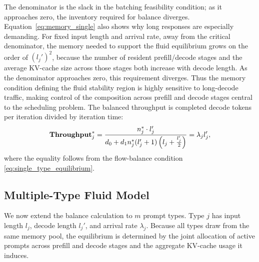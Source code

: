 The denominator is the slack in the batching feasibility condition; as it approaches zero, the inventory required for balance diverges. Equation~\eqref{eq:memory_single} also shows why long responses are especially demanding. For fixed input length and arrival rate, away from the critical denominator, the memory needed to support the fluid equilibrium grows on the order of \((l_j')^2\), because the number of resident prefill/decode stages and the average KV-cache size across those stages both increase with decode length. As the denominator approaches zero, this requirement diverges. Thus the memory condition defining the fluid stability region is highly sensitive to long-decode traffic, making control of the composition across prefill and decode stages central to the scheduling problem.
The balanced throughput is completed decode tokens per iteration divided by iteration time:
\begin{equation}\label{eq:throughput_fluid}
\textbf{Throughput}_j^* = \frac{n_j^* \cdot l_j'}{d_0+d_1n_j^*(l_j'+1)\left({l_j+\frac{l_j'}{2}}\right)} = \lambda_j l_j',
\end{equation}
where the equality follows from the flow-balance condition \eqref{eq:single_type_equilibrium}.

\subsection{Multiple-Type Fluid Model}
We now extend the balance calculation to \(m\) prompt types. Type \(j\) has input length \(l_j\), decode length \(l_j'\), and arrival rate \(\lambda_j\). Because all types draw from the same memory pool, the equilibrium is determined by the joint allocation of active prompts across prefill and decode stages and the aggregate KV-cache usage it induces.

